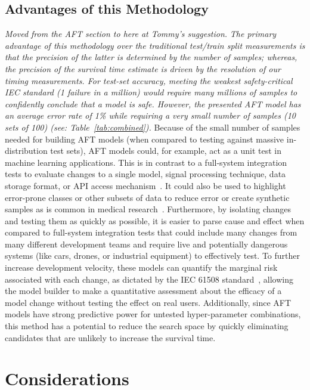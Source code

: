 \documentclass[conference]{IEEEtran}
\newcommand{\cm}[1]{\textit{{\color{blue}#1}}}
\begin{document}
\subsection{Advantages of this Methodology}
\label{advantages}
\cm{Moved from the AFT section to here at Tommy's suggestion.}
\cm{The primary advantage of this methodology over the traditional test/train split measurements is that the precision of the latter is determined by the number of samples; whereas, the precision of the survival time estimate is driven by the resolution of our timing measurements. For test-set accuracy,  meeting the weakest safety-critical IEC standard (1 failure in a million) would require many millions of samples to confidently conclude that a model is safe. However, the presented AFT model has an average error rate of 1\% while requiring a very small number of samples (10 sets of 100) (see: Table~\ref{tab:combined}).}
Because of the small number of samples needed for building AFT models (when compared to testing against massive in-distribution test sets), AFT models could, for example, act as a unit test in machine learning applications. 
This is in contrast to a full-system integration tests to evaluate changes to a single model, signal processing technique, data storage format, or API access mechanism~\cite{schmoor2000sample,lachin1981introduction}. It could also be used to highlight error-prone classes or other subsets of data to reduce error or create synthetic samples as is common in medical research~\cite{kleinbaum1996survival}. Furthermore, by isolating changes and testing them as quickly as possible, it is easier to parse cause and effect when compared to full-system integration tests that could include many changes from many different development teams and require live and potentially dangerous systems (like cars, drones, or industrial equipment) to effectively test. To further increase development velocity, these models can quantify the marginal risk associated with each change, as dictated by the IEC 61508 standard~\cite{IEC61508}, allowing the model builder to make a quantitative assessment about the efficacy of a model change without testing the effect on real users. Additionally, since AFT models have strong predictive power for untested hyper-parameter combinations, this method has a potential to reduce the search space by quickly eliminating candidates that are unlikely to increase the survival time. 

\section{Considerations}
\label{considerations}
\end{document}
